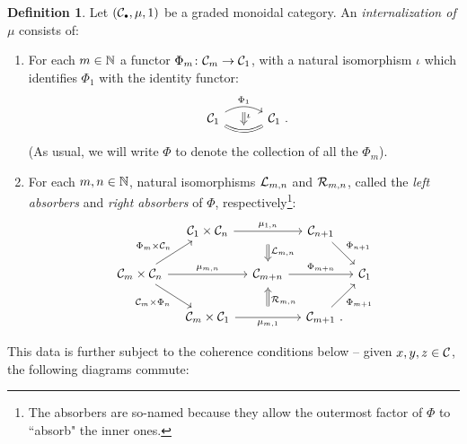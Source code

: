 \documentclass[openany, amssymb, psamsfonts]{amsart}
\theoremstyle{definition}
\newtheorem{defn}{Definition}[section]
\numberwithin{equation}{section}
\begin{document}
\begin{defn} \label{def:internalization}
Let $(\C_\sbull, \mu, 1)$ be a graded monoidal category. An \emph{internalization of $\mu$} consists of:
\begin{enumerate}
    \item For each $m \in \mathbb{N}$ a functor $\Phi_m \colon \mathcal{C}_m \to \mathcal{C}_1$, with a natural isomorphism $\iota$ which identifies $\Phi_1$ with the identity functor:
    \begin{equation*}
        \begin{tikzcd}[column sep = 3em]
            \C_1 \ar[r, bend right, equals, ""{name = B}] \ar[r, bend left, "\Phi_1"{name = A}] & \C_1 \period \ar[from = A, to = B, Rightarrow, shorten <=1ex, "\iota"]
        \end{tikzcd}
    \end{equation*} (As usual, we will write $\Phi$ to denote the collection of all the $\Phi_m$).
    \item For each $m, n \in \mathbb{N}$, natural isomorphisms $\mathcal{L}_{m, n}$ and $\mathcal{R}_{m, n}$, called the \emph{left absorbers} and \emph{right absorbers} of $\Phi$, respectively\footnote{The absorbers are so-named because they allow the outermost factor of $\Phi$ to ``absorb" the inner ones.}:
    \begin{equation*}
        \begin{tikzcd}[column sep = 1em]
            & \C_1 \times \C_n \ar[rr, "\mu_{1, n}"] & {} \ar[d, Rightarrow,  shorten <= 1ex, shorten >= 0.5ex, "\calL_{m, n}"] & \C_{n + 1} \ar[dr, "\Phi_{n + 1}"]\\
            \C_m \times \C_n \ar[rr, "\mu_{m, n}"] \ar[dr, "\C_m \times \Phi_n"'] \ar[ur, "\Phi_m \times \C_n"] & {} & \C_{m + n} \ar[rr, "\Phi_{m + n}"] & {} & \C_1 \\
            & \C_m \times \C_1 \ar[rr, "\mu_{m, 1}"'] & {} \ar[u, Rightarrow, shorten <=1.8ex, shorten >= 0.4ex, "\calR_{m, n}"'] & \C_{m + 1} \period \ar[ur, "\Phi_{m + 1}"']
        \end{tikzcd}
    \end{equation*}
\end{enumerate} This data is further subject to the coherence conditions below -- given $x, y, z \in \mathcal{C}$, the following diagrams commute:


\end{defn}
\end{document}
